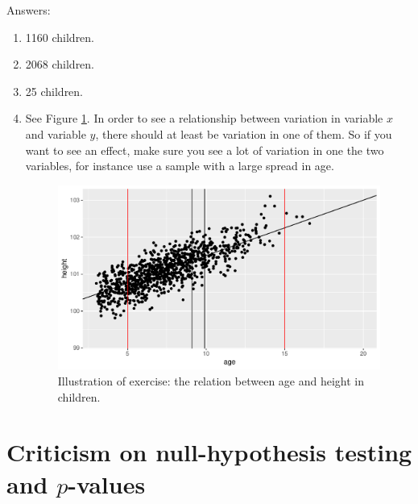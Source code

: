 \documentclass[]{report}\usepackage[]{graphicx}\usepackage[]{color}
\makeatletter
\def\maxwidth{ %
  \ifdim\Gin@nat@width>\linewidth
    \linewidth
  \else
    \Gin@nat@width
  \fi
}
\newenvironment{knitrout}{}{} %
\makeatother
\begin{document}
Answers:
\begin{enumerate}

\item 1160 children.

\item 2068 children.

\item 25 children.


\item See Figure \ref{fig:bla}. In order to see a relationship between variation in variable $x$ and variable $y$, there should at least be variation in one of them. So if you want to see an effect, make sure you see a lot of variation in one the two variables, for instance use a sample with a large spread in age.

\begin{knitrout}
\color{fgcolor}\begin{figure}

{\centering \includegraphics[width=\maxwidth]{figure/bla-1} 

}

\caption[Illustration of exercise]{Illustration of exercise: the relation between age and height in children.}\label{fig:bla}
\end{figure}


\end{knitrout}




\end{enumerate}


\section{Criticism on null-hypothesis testing and $p$-values}
\end{document}
